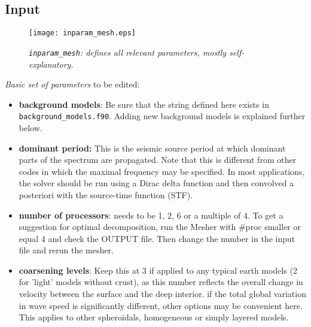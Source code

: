 \documentclass[11pt,letter,fleqn,english,notitlepage]{article}
\begin{document}
\subsection{Input}
\begin{figure*}[htb]
\begin{center}
\texttt{[image: inparam\_mesh.eps]}
\caption{\textit{{\tt inparam\_mesh}: defines all relevant parameters, mostly self-explanatory. }}
\end{center}
\end{figure*}

\noindent \textit{Basic set of parameters} to be edited:
\begin{itemize}
    \item \textbf{background models}: Be sure that the string defined here exists in 
    {\tt background\_models.f90}. Adding new background models is explained further below.
    
    \item \textbf{dominant period:} This is the seismic source period at which
    dominant parts of the spectrum are propagated. Note that this is different
    from other codes in which the maximal frequency may be specified.  In most
    applications, the solver should be run using a Dirac delta function and
    then convolved a posteriori with the source-time function (STF).
    
    \item \textbf{number of processors}: needs to be 1, 2, 6 or a multiple of
    4. To get a suggestion for optimal decomposition, run the Mesher with \#proc
    smaller or equal 4 and check the OUTPUT file. Then change the number in the
    input file and rerun the mesher.

    \item \textbf{coarsening levels}: Keep this at 3 if applied to any typical earth models
    (2 for 'light' models without crust), as this number reflects the overall
    change in velocity between the surface and the deep interior.  if the total
    global variation in wave speed is significantly different, other options
    may be convenient here. This applies to other spheroidals, homogeneous or
    simply layered models.
\end{itemize}
\end{document}

